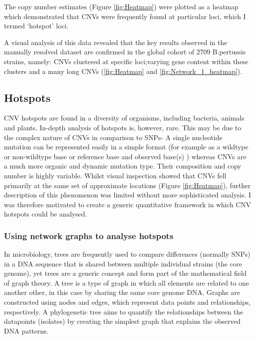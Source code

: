 \documentclass{article}
\begin{document}
The copy number estimates (Figure \ref{fig:Heatmap}) were plotted as a heatmap which demonstrated that CNVs were frequently found at particular loci, which I termed ‘hotspot’ loci.  

A visual analysis of this data revealed that the key results observed in the manually resolved dataset are confirmed in the global cohort of 2709 B.pertussis strains, namely: CNVs clustered at specific loci;varying gene content within these clusters and a many long CNVs (\ref{fig:Heatmap} and \ref{fig:Network_1_heatmap}).





\subsection{Hotspots}


CNV hotspots are found in a diversity of organisms, including bacteria, animals and plants. In-depth analysis of hotspots is, however, rare. This may be due to the complex nature of CNVs in comparison to SNPs- A single nucleotide mutation can be represented easily in a simple format (for example as a wildtype or non-wildtype base or reference base and observed base(s) ) whereas CNVs are a much more organic and dynamic mutation type. Their composition and copy number is highly variable. Whilst visual inspection showed that CNVs fell primarily at the same set of approximate locations (Figure \ref{fig:Heatmap}),  further description of this phenomenon was limited without more sophisticated analysis. I was therefore motivated to create a generic quantitative framework in which CNV hotspots could be analysed.

\subsubsection{Using network graphs to analyse hotspots}

In microbiology,  trees are frequently used to compare differences (normally SNPs) in a DNA sequence that is shared between multiple individual strains (the core genome), yet trees are a generic concept and form part of the mathematical field of graph theory. A tree is a type of graph in which all elements are related to one another other, in this case by sharing the same core genome DNA. Graphs are constructed using nodes and edges, which represent data points and relationships, respectively. A phylogenetic tree aims to quantify the relationships between the datapoints (isolates) by creating the simplest graph that explains the observed DNA patterns.
\end{document}
